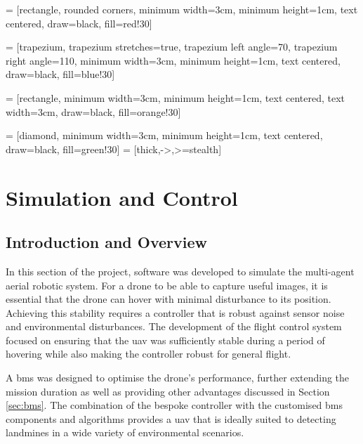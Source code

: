 \usetikzlibrary{shapes.geometric, arrows}

 = [rectangle, rounded corners, 
minimum width=3cm, 
minimum height=1cm,
text centered, 
draw=black, 
fill=red!30]

 = [trapezium, 
trapezium stretches=true, %
trapezium left angle=70, 
trapezium right angle=110, 
minimum width=3cm, 
minimum height=1cm, text centered, 
draw=black, fill=blue!30]

 = [rectangle, 
minimum width=3cm, 
minimum height=1cm, 
text centered, 
text width=3cm, 
draw=black, 
fill=orange!30]

 = [diamond, 
minimum width=3cm, 
minimum height=1cm, 
text centered, 
draw=black, 
fill=green!30]
 = [thick,->,>=stealth]



\section{Simulation and Control}

\subsection{Introduction and Overview}

In this section of the project, software was developed to simulate the multi-agent aerial robotic system. For a drone to be able to capture useful images, it is essential that the drone can hover with minimal disturbance to its position. Achieving this stability requires a controller that is robust against sensor noise and environmental disturbances. The development of the flight control system focused on ensuring that the \gls{uav} was sufficiently stable during a period of hovering while also making the controller robust for general flight.

A \gls{bms} was designed to optimise the drone's performance, further extending the mission duration as well as providing other advantages discussed in Section \ref{sec:bms}. The combination of the bespoke controller with the customised \gls{bms} components and algorithms provides a \gls{uav} that is ideally suited to detecting landmines in a wide variety of environmental scenarios.

